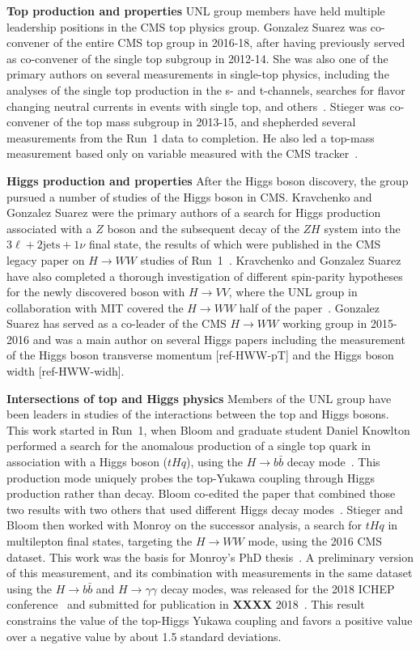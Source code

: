 {\bf Top production and properties} 
UNL group members have held multiple leadership positions in the CMS top
physics group.  Gonzalez Suarez was co-convener of the entire CMS top group
in 2016-18, after having previously served as co-convener of the single top
subgroup in 2012-14.  She was also one of the primary authors on several
measurements in single-top physics, including the analyses of the single
top production in the s- and t-channels, searches for flavor changing
neutral currents in events with single top, and
others~\cite{bib:single-top-papers}.  Stieger was co-convener of the top
mass subgroup in 2013-15, and shepherded several measurements from the
Run~1 data to completion.  He also led a top-mass measurement based only on
variable measured with the CMS tracker~\cite{bib:tracker-top-mass}.

{\bf Higgs production and properties}
After the Higgs boson discovery, the group pursued a number of studies of the Higgs boson in CMS. Kravchenko and Gonzalez Suarez were the primary authors of a search for Higgs production associated with a $Z$ boson and the subsequent decay of the $ZH$ system into the $3\ell+2\text{jets}+1\nu$ final state, the results of which were published in the CMS legacy paper on $H\rightarrow WW$ studies of Run~1~\cite{bib:HWWlegacy}. Kravchenko and Gonzalez Suarez have also completed a thorough investigation of different spin-parity hypotheses for the newly discovered boson with $H\rightarrow VV$, where the UNL group in collaboration with MIT covered the $H\rightarrow WW$ half of the paper~\cite{bib:higgs-spin-parity}. Gonzalez Suarez has served as a co-leader of the CMS $H\to WW$ working group in 2015-2016 and was a main author on several Higgs papers including the measurement of the Higgs boson transverse momentum [ref-HWW-pT] and the Higgs boson width [ref-HWW-widh].

{\bf Intersections of top and Higgs physics} Members of the UNL group have been leaders in studies of the interactions between the top and Higgs bosons.  This work started in Run~1, when Bloom and graduate student Daniel Knowlton performed a search for the anomalous production of a single top quark in association with a Higgs boson ($tHq$), using the $H \to b\bar{b}$ decay mode~\cite{bib:tHqbbPAS}.  This production mode uniquely probes the top-Yukawa coupling through Higgs production rather than decay.  Bloom co-edited the paper that combined those two results with two others that used different Higgs decay modes~\cite{bib:tHqRun1}.  Stieger and Bloom then worked with Monroy on the successor analysis, a search for $tHq$ in multilepton final states, targeting the $H \to WW$ mode, using the 2016 CMS dataset.  This work was the basis for Monroy's PhD thesis~\cite{bib:monroy_thesis}.  A preliminary version of this measurement, and its combination with measurements in the same dataset using the $H\to b\bar{b}$ and $H \to \gamma\gamma$ decay modes, was released for the 2018 ICHEP conference~\cite{bib:tHqRun2PAS} and submitted for publication in {\bf XXXX} 2018~\cite{bib:tHqRun2}.  This result constrains the value of the top-Higgs Yukawa coupling and favors a positive value over a negative value by about 1.5 standard deviations.

